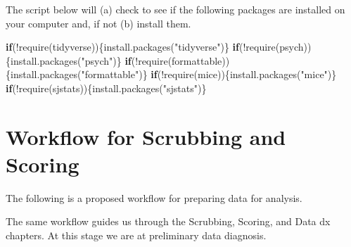 \documentclass[
  english,
]{book}
\newenvironment{Shaded}{\begin{snugshade}}{\end{snugshade}}
\newcommand{\ControlFlowTok}[1]{\textcolor[rgb]{0.13,0.29,0.53}{\textbf{#1}}}
\newcommand{\FunctionTok}[1]{\textcolor[rgb]{0.00,0.00,0.00}{#1}}
\newcommand{\NormalTok}[1]{#1}
\newcommand{\SpecialCharTok}[1]{\textcolor[rgb]{0.00,0.00,0.00}{#1}}
\newcommand{\StringTok}[1]{\textcolor[rgb]{0.31,0.60,0.02}{#1}}
\begin{document}
The script below will (a) check to see if the following packages are installed on your computer and, if not (b) install them.

\begin{Shaded}
\begin{Highlighting}[]
\ControlFlowTok{if}\NormalTok{(}\SpecialCharTok{!}\FunctionTok{require}\NormalTok{(tidyverse))\{}\FunctionTok{install.packages}\NormalTok{(}\StringTok{"tidyverse"}\NormalTok{)\}}
\ControlFlowTok{if}\NormalTok{(}\SpecialCharTok{!}\FunctionTok{require}\NormalTok{(psych))\{}\FunctionTok{install.packages}\NormalTok{(}\StringTok{"psych"}\NormalTok{)\}}
\ControlFlowTok{if}\NormalTok{(}\SpecialCharTok{!}\FunctionTok{require}\NormalTok{(formattable))\{}\FunctionTok{install.packages}\NormalTok{(}\StringTok{"formattable"}\NormalTok{)\}}
\ControlFlowTok{if}\NormalTok{(}\SpecialCharTok{!}\FunctionTok{require}\NormalTok{(mice))\{}\FunctionTok{install.packages}\NormalTok{(}\StringTok{"mice"}\NormalTok{)\}}
\ControlFlowTok{if}\NormalTok{(}\SpecialCharTok{!}\FunctionTok{require}\NormalTok{(sjstats))\{}\FunctionTok{install.packages}\NormalTok{(}\StringTok{"sjstats"}\NormalTok{)\}}
\end{Highlighting}
\end{Shaded}

\hypertarget{workflow-for-scrubbing-and-scoring-1}{%
\section{Workflow for Scrubbing and Scoring}\label{workflow-for-scrubbing-and-scoring-1}}

The following is a proposed workflow for preparing data for analysis.

The same workflow guides us through the Scrubbing, Scoring, and Data dx chapters. At this stage we are at preliminary data diagnosis.
\end{document}
